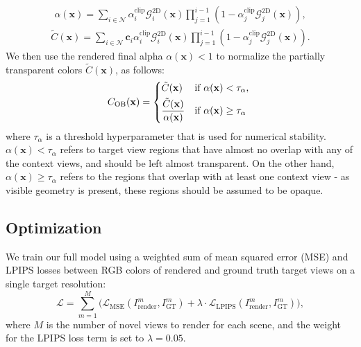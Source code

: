 \documentclass[runningheads]{llncs}
\begin{document}
\begin{equation}
  \begin{split}
  \alpha(\mathbf{x})=\sum_{i\in\mathcal{N}}\alpha^\text{clip}_i\mathcal{G}_i^\text{2D}(\mathbf{x})\prod_{j=1}^{i-1}(1-\alpha^\text{clip}_j\mathcal{G}_j^\text{2D}(\mathbf{x})),
  \end{split}
  \label{eq:ob_alpha_rasterization}
\end{equation}
\begin{equation}
  \begin{split}
  \tilde{C}(\mathbf{x})=\sum_{i\in\mathcal{N}}\mathbf{c}_i\alpha^\text{clip}_i\mathcal{G}_i^\text{2D}(\mathbf{x})\prod_{j=1}^{i-1}(1-\alpha^\text{clip}_j\mathcal{G}_j^\text{2D}(\mathbf{x})).
  \end{split}
  \label{eq:ob_color_rasterization}
\end{equation}
We then use the rendered final alpha $\alpha(\mathbf{x})<1$ to normalize the partially transparent colors $\tilde{C}(\mathbf{x})$, as follows:
\begin{equation}
  \begin{split}
  C_\text{OB}(\mathbf{x})=
  \begin{dcases*}
  \tilde{C}(\mathbf{x}) & if $\alpha(\mathbf{x})<\tau_\alpha,$ \\
  \frac{\tilde{C}(\mathbf{x})}{\alpha(\mathbf{x})} & if $\alpha(\mathbf{x})\geq\tau_\alpha$
  \end{dcases*}
  \end{split}
  \label{eq:ob_color_normalization}
\end{equation}
where $\tau_\alpha$ is a threshold hyperparameter that is used for numerical stability. $\alpha(\mathbf{x})<\tau_\alpha$ refers to target view regions that have almost no overlap with any of the context views, and should be left almost transparent. On the other hand, $\alpha(\mathbf{x})\geq\tau_\alpha$ refers to the regions that overlap with at least one context view - as visible geometry is present, these regions should be assumed to be opaque.

\subsection{Optimization}
We train our full model using a weighted sum of mean squared error (MSE) and LPIPS \cite{zhang2018unreasonable} losses between RGB colors of rendered and ground truth target views on a single target resolution:
\begin{equation}
    \mathcal{L}=\sum_{m=1}^{M}\big(\mathcal{L}_\text{MSE}(I_\text{render}^m,I_\text{GT}^m)+\lambda\cdot\mathcal{L}_\text{LPIPS}(I_\text{render}^m,I_\text{GT}^m)\big),
    \label{eq:loss}
\end{equation}
where $M$ is the number of novel views to render for each scene, and the weight for the LPIPS loss term is set to $\lambda=0.05$.
\end{document}
